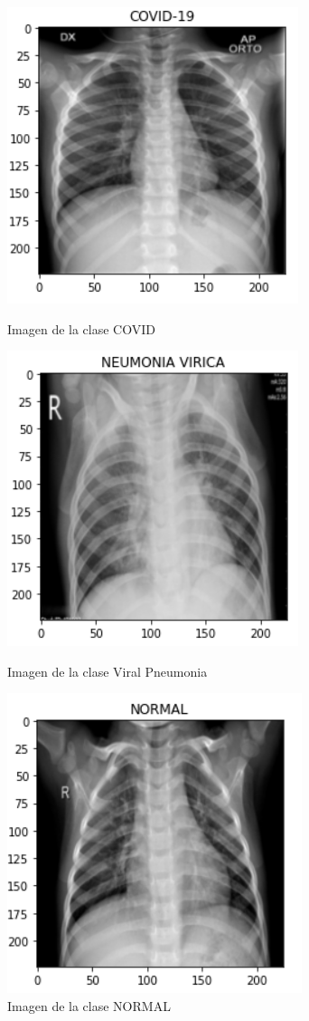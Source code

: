 \documentclass[11pt,a4paper]{article}
\theoremstyle{definition}
\begin{document}
\begin{figure}[H]
  \centering
  \begin{minipage}[b]{0.25\textwidth}
    \includegraphics[scale=0.65]{./images/ejemploCOVID}
	\caption{Imagen de la clase COVID}
  \end{minipage}
  \hfill
  \begin{minipage}[b]{0.25\textwidth}
    \includegraphics[scale=0.65]{./images/ejemploNEUMONIAVIRICA}
	\caption{Imagen de la clase Viral Pneumonia}
  \end{minipage}
    \hfill
    \begin{minipage}[b]{0.25\textwidth}
    \includegraphics[scale=0.65]{./images/ejemploNORMAL}
	\caption{Imagen de la clase NORMAL}
  \end{minipage}
\end{figure}
\end{document}
